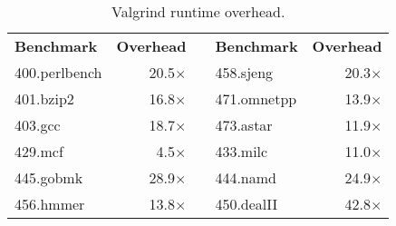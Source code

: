 \begin{table}[!t]
	\centering
	\begin{tabular}{l|r p{0.1em} l|r}
		\textbf{Benchmark} & \textbf{Overhead} & & \textbf{Benchmark} & \textbf{Overhead} \\
		\cline{1-2} \cline{4-5}
		400.perlbench	& 20.5$\times$	& & 458.sjeng	& 20.3$\times$	\\
		401.bzip2		& 16.8$\times$	& & 471.omnetpp	& 13.9$\times$	\\
		403.gcc			& 18.7$\times$	& & 473.astar	& 11.9$\times$	\\
		429.mcf			& 4.5$\times$ 	& & 433.milc		& 11.0$\times$	\\
		445.gobmk		& 28.9$\times$	& & 444.namd		& 24.9$\times$	\\
		456.hmmer		& 13.8$\times$	& & 450.dealII	& 42.8$\times$	\\
	\end{tabular}
	\caption{Valgrind runtime overhead. \label{table:valgrind}}
\end{table}
